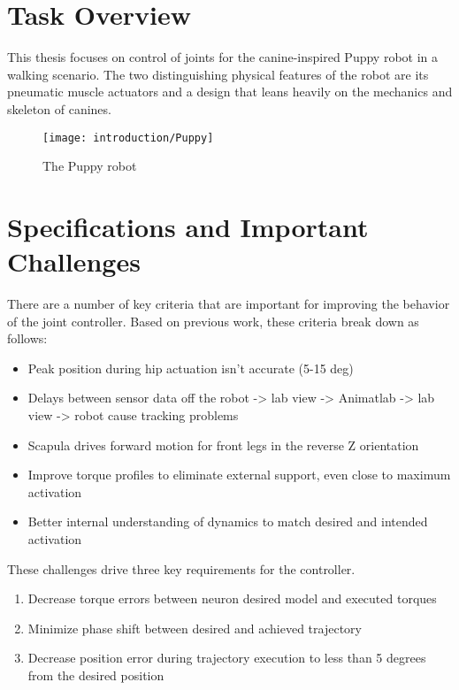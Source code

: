 \section{Task Overview}

This thesis focuses on control of joints for the canine-inspired
Puppy robot in a walking scenario. The two distinguishing physical features of 
the robot are its pneumatic muscle actuators and a design that leans heavily
on the mechanics and skeleton of canines.

\begin{figure}
\centering
\texttt{[image: introduction/Puppy]}
\caption{The Puppy robot}
\label{fig:Puppy}
\end{figure}

\section{Specifications and Important Challenges}

There are a number of key criteria that are important for improving the behavior
of the joint controller. Based on previous work, these criteria break down as follows:

\begin{itemize}
\item Peak position during hip actuation isn't accurate (5-15 deg) 
\item Delays between sensor data off the robot -> lab view -> Animatlab -> lab
view -> robot cause tracking problems
\item Scapula drives forward motion for front legs in the reverse Z orientation
\item Improve torque profiles to eliminate external support, even close to
maximum activation
\item Better internal understanding of dynamics to match desired and intended activation
\end{itemize}

These challenges drive three key requirements for the controller.

\begin{enumerate}
\item Decrease torque errors between neuron desired model and executed torques
\item Minimize phase shift between desired and achieved trajectory
\item Decrease position error during trajectory execution to less than 5 degrees from the desired position
\end{enumerate}

